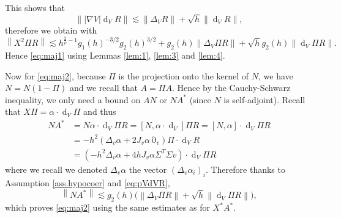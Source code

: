 \documentclass[12pt]{amsart}
\renewcommand{\d}{\operatorname{d}}
\numberwithin{equation}{section}
\numberwithin{figure}{section}
\DeclareMathOperator{\p}{\partial}
\newcommand{\vvert}[1]{\left\lVert#1\right\rVert}
\begin{document}
This shows that
\begin{equation}\label{eq:pVdVR}
\vvert{|\nabla V|\d_VR} \lesssim \vvert{\Delta_VR} + \sqrt{h}\vvert{\d_VR},
\end{equation}
therefore we obtain with
\begin{equation*}
\vvert{X^2\Pi R} \lesssim h^{\frac{2}{\overline{\nu}} - 1}g_1(h)^{-3/2}g_2(h)^{3/2} + g_2(h)\vvert{\Delta_V\Pi R} + \sqrt hg_2(h)\vvert{\d_V \Pi R}.
\end{equation*}
Hence \eqref{eq:maj1} using Lemmas \ref{lem:1}, \ref{lem:3} and \ref{lem:4}.

















































Now for \eqref{eq:maj2}, because $\Pi$ is the projection onto the kernel of $N$, we have $N = N(1-\Pi)$ and we recall that $A = \Pi A$. Hence by the Cauchy-Schwarz inequality, we only need a bound on $AN$ or $NA^*$ (since $N$ is self-adjoint). Recall that $X\Pi = \alpha\cdot\d_V\Pi$ and thus
\begin{equation*}
\begin{aligned}
    NA^* &= N\alpha\cdot\d_V\Pi R = [N,\alpha\cdot\d_V]\Pi R = [N,\alpha]\cdot\d_V\Pi R\\
    &= -h^2(\Delta_v\alpha + 2J_v\alpha\p_v)\Pi\cdot\d_V R\\
    &= (-h^2\Delta_v\alpha + 4hJ_v\alpha\Sigma^T\Sigma v)\cdot\d_V\Pi R
\end{aligned}
\end{equation*}
where we recall we denoted $\Delta_v\alpha$ the vector $(\Delta_v\alpha_i)_i$. Therefore thanks to Assumption \ref{ass.hypocoer} and \eqref{eq:pVdVR},
\begin{equation*}
\vvert{NA^*} \lesssim g_2(h)\big(\vvert{\Delta_V\Pi R} + \sqrt{h}\vvert{\d_V\Pi R}\big),
\end{equation*}
which proves \eqref{eq:maj2} using the same estimates as for $X^*A^*$.
\end{document}
